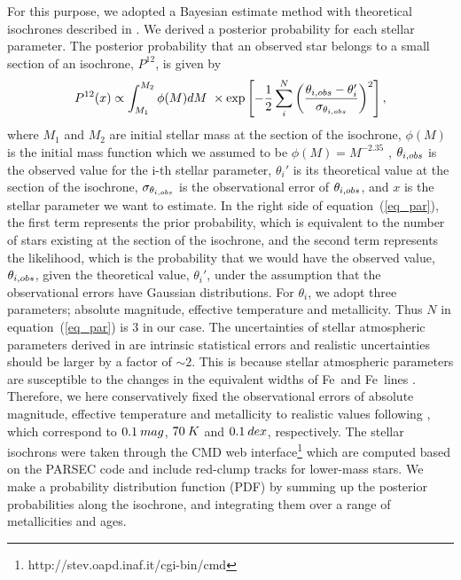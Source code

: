 \documentclass[]{pasj01}
\begin{document}
For this purpose, we adopted a Bayesian estimate method with theoretical isochrones described in \citet{daSilva2006}.
We derived a posterior probability for each stellar parameter.
The posterior probability that an observed star belongs to a small section of an isochrone, $P^{12}$, is given by 
\begin{equation}
\label{eq_par}
P^{12}(x)\propto \int^{M_2}_{M_1}\phi(M)dM\ \times \exp \left[-\frac{1}{2}\sum^{N}_{i}\left(\frac{\theta_{i,{\rm obs}}-\theta_{i}'}{\sigma_{\theta_{i,{\rm obs}}}}\right)^2\right],
\end{equation}
where $M_1$ and $M_2$ are initial stellar mass at the section of the isochrone, $\phi(M)$ is the initial mass function which we assumed to be $\phi(M)=M^{-2.35}$ \citep{Salpeter1955}, $\theta_{i,{\rm obs}}$ is the observed value for the i-th stellar parameter, $\theta_{i}'$ is its theoretical value at the section of the isochrone, $\sigma_{\theta_{i,{\rm obs}}}$ is the observational error of $\theta_{i,{\rm obs}}$, and $x$ is the stellar parameter we want to estimate.
In the right side of equation~(\ref{eq_par}), the first term represents the prior probability, which is equivalent to the number of stars existing at the section of the isochrone, and the second term represents the likelihood, which is the probability that we would have the observed value, $\theta_{i,{\rm obs}}$, given the theoretical value, $\theta_{i}'$, under the assumption that the observational errors have Gaussian distributions.
For $\theta_{i}$, we adopt three parameters; absolute magnitude, effective temperature and metallicity. 
Thus $N$ in equation~(\ref{eq_par}) is $3$ in our case.
The uncertainties of stellar atmospheric parameters derived in \citet{Takeda2008} are intrinsic statistical errors and realistic uncertainties should be larger by a factor of $\sim2$.
This is because stellar atmospheric parameters are susceptible to the changes in the equivalent widths of Fe\, and Fe\, lines \citep{Takeda2008}.
Therefore, we here conservatively fixed the observational errors of absolute magnitude, effective temperature and metallicity to realistic values following \citet{daSilva2006}, which correspond to $0.1\>{\rm mag}$, $70\>{\rm K}$ and $0.1\>{\rm dex}$, respectively.
The stellar isochrons were taken through the CMD web interface\footnote{http://stev.oapd.inaf.it/cgi-bin/cmd} \citep{Bressan2012} which are computed based on the PARSEC code and include red-clump tracks for lower-mass stars.
We make a probability distribution function (PDF) by summing up the posterior probabilities along the isochrone, and integrating them over a range of metallicities and ages. 
\end{document}
